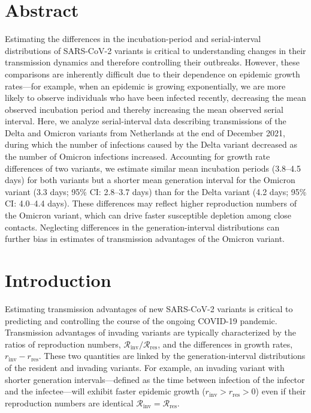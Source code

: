 \documentclass[12pt]{article}
\date{\today}
\newcommand{\Rx}[1]{\ensuremath{{\mathcal R}_{#1}}\xspace}
\newcommand{\Rres}{\Rx{\mathrm{res}}}
\newcommand{\Rinv}{\Rx{\mathrm{inv}}}
\newcommand{\rx}[1]{\ensuremath{{r}_{#1}}\xspace}
\newcommand{\rres}{\rx{\mathrm{res}}}
\newcommand{\rinv}{\rx{\mathrm{inv}}}
\begin{document}
\begin{flushleft}{
	\Large
	\textbf{}
}
\bigskip

\section*{Abstract}

Estimating the differences in the incubation-period and serial-interval distributions of SARS-CoV-2 variants is critical to understanding changes in their transmission dynamics and therefore controlling their outbreaks.
However, these comparisons are inherently difficult due to their dependence on epidemic growth rates---for example, when an epidemic is growing exponentially, we are more likely to observe individuals who have been infected recently, decreasing the mean observed incubation period and thereby increasing the mean observed serial interval.
Here, we analyze serial-interval data describing transmissions of the Delta and Omicron variants from Netherlands at the end of December 2021, during which the number of infections caused by the Delta variant decreased as the number of Omicron infections increased. 
Accounting for growth rate differences of two variants, we estimate similar mean incubation periods (3.8--4.5 days) for both variants but a shorter mean generation interval for the Omicron variant (3.3 days; 95\% CI: 2.8--3.7 days) than for the Delta variant (4.2 days; 95\% CI: 4.0--4.4 days).
These differences may reflect higher reproduction numbers of the Omicron variant, which can drive faster susceptible depletion among close contacts.
Neglecting differences in the generation-interval distributions can further bias in estimates of transmission advantages of the Omicron variant.

\end{flushleft}

\pagebreak

\section{Introduction}

Estimating transmission advantages of new SARS-CoV-2 variants is critical to predicting and controlling the course of the ongoing COVID-19 pandemic.
Transmission advantages of invading variants are typically characterized by the ratios of reproduction numbers, $\Rinv/\Rres$, and the differences in growth rates, $\rinv-\rres$.
These two quantities are linked by the generation-interval distributions of the resident and invading variants.
For example, an invading variant with shorter generation intervals---defined as the time between infection of the infector and the infectee---will exhibit faster epidemic growth ($\rinv > \rres > 0$) even if their reproduction numbers are identical  $\Rinv = \Rres$.
\end{document}
